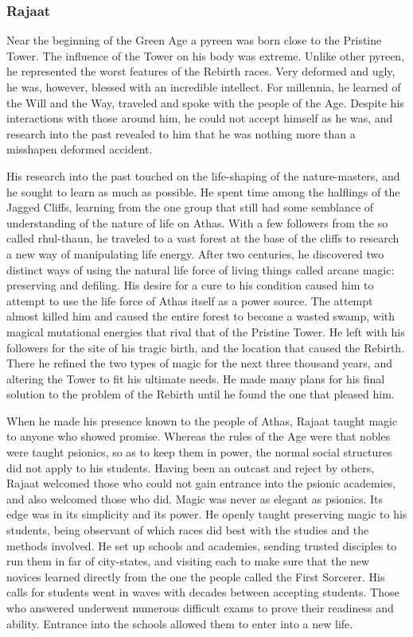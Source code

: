 \subsubsection{Rajaat}
Near the beginning of the Green Age a pyreen was born close to the Pristine Tower. The influence of the Tower on his body was extreme. Unlike other pyreen, he represented the worst features of the Rebirth races. Very deformed and ugly, he was, however, blessed with an incredible intellect. For millennia, he learned of the Will and the Way, traveled and spoke with the people of the Age. Despite his interactions with those around him, he could not accept himself as he was, and research into the past revealed to him that he was nothing more than a misshapen deformed accident.

His research into the past touched on the life-shaping of the nature-masters, and he sought to learn as much as possible. He spent time among the halflings of the Jagged Cliffs, learning from the one group that still had some semblance of understanding of the nature of life on Athas. With a few followers from the so called rhul-thaun, he traveled to a vast forest at the base of the cliffs to research a new way of manipulating life energy. After two centuries, he discovered two distinct ways of using the natural life force of living things called arcane magic: preserving and defiling. His desire for a cure to his condition caused him to attempt to use the life force of Athas itself as a power source. The attempt almost killed him and caused the entire forest to become a wasted swamp, with magical mutational energies that rival that of the Pristine Tower. He left with his followers for the site of his tragic birth, and the location that caused the Rebirth. There he refined the two types of magic for the next three thousand years, and altering the Tower to fit his ultimate needs. He made many plans for his final solution to the problem of the Rebirth until he found the one that pleased him.

When he made his presence known to the people of Athas, Rajaat taught magic to anyone who showed promise. Whereas the rules of the Age were that nobles were taught psionics, so as to keep them in power, the normal social structures did not apply to his students. Having been an outcast and reject by others, Rajaat welcomed those who could not gain entrance into the psionic academies, and also welcomed those who did. Magic was never as elegant as psionics. Its edge was in its simplicity and its power. He openly taught preserving magic to his students, being observant of which races did best with the studies and the methods involved. He set up schools and academies, sending trusted disciples to run them in far of city-states, and visiting each to make sure that the new novices learned directly from the one the people called the First Sorcerer. His calls for students went in waves with decades between accepting students. Those who answered underwent numerous difficult exams to prove their readiness and ability. Entrance into the schools allowed them to enter into a new life.

